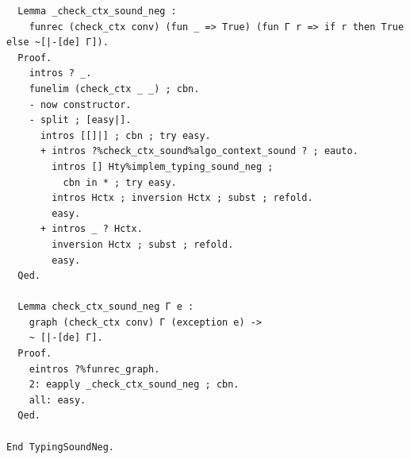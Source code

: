 \begin{lstlisting}
  Lemma _check_ctx_sound_neg :
    funrec (check_ctx conv) (fun _ => True) (fun Γ r => if r then True else ~[|-[de] Γ]).
  Proof.
    intros ? _.
    funelim (check_ctx _ _) ; cbn.
    - now constructor.
    - split ; [easy|].
      intros [[]|] ; cbn ; try easy.
      + intros ?%check_ctx_sound%algo_context_sound ? ; eauto.
        intros [] Hty%implem_typing_sound_neg ;
          cbn in * ; try easy.
        intros Hctx ; inversion Hctx ; subst ; refold.
        easy.
      + intros _ ? Hctx.
        inversion Hctx ; subst ; refold.
        easy.
  Qed.
     
  Lemma check_ctx_sound_neg Γ e :
    graph (check_ctx conv) Γ (exception e) ->
    ~ [|-[de] Γ].
  Proof.
    eintros ?%funrec_graph.
    2: eapply _check_ctx_sound_neg ; cbn.
    all: easy.
  Qed.

End TypingSoundNeg.
\end{lstlisting}

